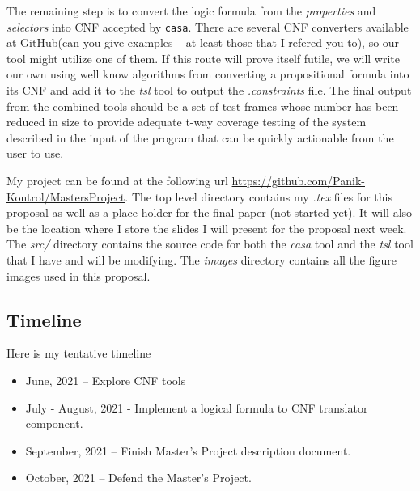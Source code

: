 \documentclass[a4full,12pt]{article}
\newcommand{\eas}[1]{{\color{blue}\sf ({#1})}}
\begin{document}
  The remaining step is to convert the logic formula from the \emph{properties} and \emph{selectors} into CNF accepted by \texttt{casa}. There are several CNF converters available at GitHub\eas{can you give examples -- at least those that I refered you to}, so our tool might utilize one of them. If
this route will prove itself futile,  we will write our own using well know algorithms from converting a propositional formula into its CNF and add it to the \emph{tsl} tool to output the \emph{.constraints} file. The final output from the combined tools should be a set of test
  frames whose number has been reduced in size to provide adequate t-way coverage testing of the system described
  in the input of the program that can be quickly actionable from the user to use.
  
My project can be found at the following url \url{https://github.com/Panik-Kontrol/MastersProject}.
  The top level directory contains my \emph{.tex} files for this proposal as well as a place
  holder for the final paper (not started yet). It will also be the location where I store the
  slides I will present for the proposal next week. The \emph{src/} directory contains the source
  code for both the \emph{casa} tool and the \emph{tsl} tool that I have and will be modifying.
  The \emph{images} directory contains all the figure images used in this proposal.
  
  \subsection{Timeline}
  Here is my tentative timeline
  \begin{itemize}
  \item June, 2021 -- Explore CNF tools
  \item July - August, 2021 - Implement a logical formula to CNF translator component.
  \item September, 2021 -- Finish Master's Project description document.
  \item October, 2021 -- Defend the Master's Project.
  \end{itemize}
\end{document}
